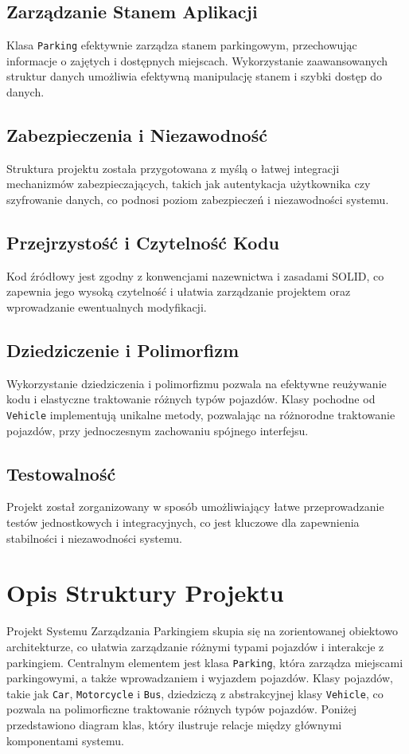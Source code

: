 \documentclass{article}
\begin{document}
\subsection{Zarządzanie Stanem Aplikacji}
Klasa \texttt{Parking} efektywnie zarządza stanem parkingowym, przechowując informacje o zajętych i dostępnych miejscach. Wykorzystanie zaawansowanych struktur danych umożliwia efektywną manipulację stanem i szybki dostęp do danych.

\subsection{Zabezpieczenia i Niezawodność}
Struktura projektu została przygotowana z myślą o łatwej integracji mechanizmów zabezpieczających, takich jak autentykacja użytkownika czy szyfrowanie danych, co podnosi poziom zabezpieczeń i niezawodności systemu.

\subsection{Przejrzystość i Czytelność Kodu}
Kod źródłowy jest zgodny z konwencjami nazewnictwa i zasadami SOLID, co zapewnia jego wysoką czytelność i ułatwia zarządzanie projektem oraz wprowadzanie ewentualnych modyfikacji.

\subsection{Dziedziczenie i Polimorfizm}
Wykorzystanie dziedziczenia i polimorfizmu pozwala na efektywne reużywanie kodu i elastyczne traktowanie różnych typów pojazdów. Klasy pochodne od \texttt{Vehicle} implementują unikalne metody, pozwalając na różnorodne traktowanie pojazdów, przy jednoczesnym zachowaniu spójnego interfejsu.

\subsection{Testowalność}
Projekt został zorganizowany w sposób umożliwiający łatwe przeprowadzanie testów jednostkowych i integracyjnych, co jest kluczowe dla zapewnienia stabilności i niezawodności systemu.

\section{Opis Struktury Projektu}

Projekt Systemu Zarządzania Parkingiem skupia się na zorientowanej obiektowo architekturze, co ułatwia zarządzanie różnymi typami pojazdów i interakcje z parkingiem. Centralnym elementem jest klasa \texttt{Parking}, która zarządza miejscami parkingowymi, a także wprowadzaniem i wyjazdem pojazdów. Klasy pojazdów, takie jak \texttt{Car}, \texttt{Motorcycle} i \texttt{Bus}, dziedziczą z abstrakcyjnej klasy \texttt{Vehicle}, co pozwala na polimorficzne traktowanie różnych typów pojazdów. Poniżej przedstawiono diagram klas, który ilustruje relacje między głównymi komponentami systemu.
\end{document}
